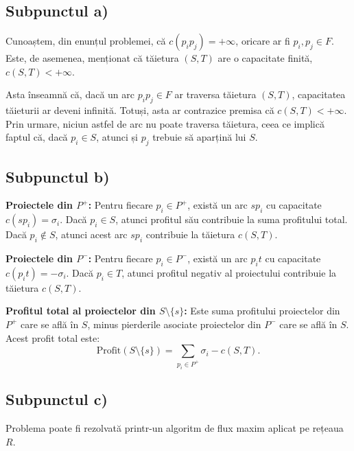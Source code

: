\documentclass{article}
\begin{document}
{\fontsize{14}{16}\selectfont 

\subsection*{Subpunctul a)}

Cunoaștem, din enunțul problemei, că \( c(p_i p_j) = +\infty \), oricare ar fi \( p_i, p_j \in F \). Este, de asemenea, menționat că tăietura \((S, T)\) are o capacitate finită, \( c(S, T) < +\infty \). 

Asta înseamnă că, dacă un arc \( p_i p_j \in F \) ar traversa tăietura \((S, T)\), capacitatea tăieturii ar deveni infinită. Totuși, asta ar contrazice premisa că \( c(S, T) < +\infty \). Prin urmare, niciun astfel de arc nu poate traversa tăietura, ceea ce implică faptul că, dacă \( p_i \in S \), atunci și \( p_j \) trebuie să aparțină lui \( S \).

\subsection*{Subpunctul b)}

\textbf{Proiectele din \( P^+ \):}  
Pentru fiecare \( p_i \in P^+ \), există un arc \( sp_i \) cu capacitate \( c(sp_i) = \sigma_i \). Dacă \( p_i \in S \), atunci profitul său contribuie la suma profitului total. Dacă \( p_i \notin S \), atunci acest arc \( sp_i \) contribuie la tăietura \( c(S, T) \).

\textbf{Proiectele din \( P^- \):}  
Pentru fiecare \( p_i \in P^- \), există un arc \( p_i t \) cu capacitate \( c(p_i t) = -\sigma_i \). Dacă \( p_i \in T \), atunci profitul negativ al proiectului contribuie la tăietura \( c(S, T) \).

\textbf{Profitul total al proiectelor din \( S \setminus \{s\} \):}  
Este suma profitului proiectelor din \( P^+ \) care se află în \( S \), minus pierderile asociate proiectelor din \( P^- \) care se află în \( S \). Acest profit total este:
\[
\text{Profit}(S \setminus \{s\}) = \sum_{p_i \in P^+} \sigma_i - c(S, T).
\]

\subsection*{Subpunctul c)}

Problema poate fi rezolvată printr-un algoritm de flux maxim aplicat pe rețeaua \( R \).

}
\end{document}
